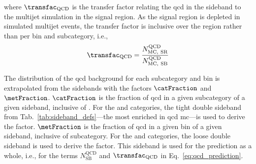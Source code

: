 where $\transfac_{\mathrm{QCD}}$ is the transfer factor relating the \acrshort{qcd} in the sideband to the multijet simulation in the signal region. As the signal region is depleted in simulated multijet events, the transfer factor is inclusive over the region rather than per \ptmiss bin and subcategory, i.e.,
\begin{equation}
    \transfac_{\mathrm{QCD}} = \frac{ N_{\mathrm{MC, \ SR}}^{\mathrm{QCD}} } { N_{\mathrm{MC, \ SB}}^{\mathrm{QCD}} }
    \label{eq:transfer_factor_qcd}
\end{equation}

The distribution of the \acrshort{qcd} background for each subcategory and \ptmiss bin is extrapolated from the sidebands with the factors $\catFraction$ and $\metFraction$. $\catFraction$ is the fraction of \acrshort{qcd} in a given subcategory of a given sideband, inclusive of \ptmiss. For the \ttH and \ggH categories, the tight double sideband from Tab.~\ref{tab:sideband_defs}---the most enriched in \acrshort{qcd} \acrshort{mc}---is used to derive the factor. $\metFraction$ is the fraction of \acrshort{qcd} in a given \ptmiss bin of a given sideband, inclusive of subcategory. For the \ttH and \ggH categories, the loose double sideband is used to derive the factor. This sideband is used for the prediction as a whole, i.e., for the terms $N_{\mathrm{SB}}^{\mathrm{QCD}}$ and $\transfac_{\mathrm{QCD}}$ in Eq.~\ref{eq:qcd_prediction}.

